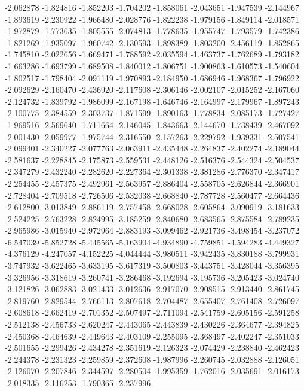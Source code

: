 -2.062878
-1.824816
-1.852203
-1.704202
-1.858061
-2.043651
-1.947539
-2.144967
-1.893619
-2.230922
-1.966480
-2.028776
-1.822238
-1.979156
-1.849114
-2.018571
-1.972879
-1.773635
-1.805555
-2.074813
-1.778635
-1.955747
-1.793579
-1.742386
-1.821269
-1.935097
-1.960742
-2.130593
-1.898389
-1.803200
-2.456119
-1.852865
-1.745810
-2.022656
-1.669471
-1.788592
-2.035594
-1.463737
-1.762689
-1.793182
-1.663286
-1.693799
-1.689508
-1.840012
-1.806751
-1.900863
-1.610573
-1.540604
-1.802517
-1.798404
-2.091119
-1.970893
-2.184950
-1.686946
-1.968367
-1.796922
-2.092629
-2.160470
-2.436920
-2.117608
-2.306146
-2.002107
-2.015252
-2.167060
-2.124732
-1.839792
-1.986099
-2.167198
-1.646746
-2.164997
-2.179967
-1.897243
-2.100775
-2.384559
-2.303737
-1.871599
-1.890163
-1.778834
-2.085173
-1.727427
-1.969516
-2.569640
-1.711664
-2.146045
-1.843663
-2.144670
-1.738439
-2.467092
-2.001430
-2.059977
-1.975744
-2.316550
-2.157263
-2.229792
-1.939331
-2.507541
-2.099401
-2.340227
-2.077763
-2.063911
-2.435448
-2.264837
-2.402274
-2.189044
-2.581637
-2.228845
-2.175873
-2.559531
-2.448126
-2.516376
-2.544324
-2.504537
-2.347279
-2.432240
-2.282620
-2.227364
-2.301338
-2.381286
-2.776370
-2.347417
-2.254455
-2.457375
-2.492961
-2.563957
-2.886404
-2.558705
-2.626844
-2.366901
-2.728404
-2.709518
-2.726506
-2.532038
-2.668840
-2.787728
-2.560477
-2.664436
-2.612800
-3.013849
-2.886119
-2.757458
-2.668028
-2.605864
-3.090919
-3.181633
-2.524225
-2.763228
-2.824995
-3.185259
-2.840680
-2.683565
-2.875584
-2.789235
-2.965986
-3.015940
-2.972964
-2.883193
-3.099462
-2.921736
-3.498454
-3.237072
-6.547039
-5.852728
-5.445565
-5.163904
-4.934890
-4.759851
-4.594283
-4.449327
-4.376129
-4.247057
-4.152225
-4.044444
-3.980511
-3.942435
-3.830188
-3.799931
-3.747932
-3.622465
-3.633195
-3.617319
-3.500803
-3.443751
-3.428044
-3.356395
-3.326956
-3.318619
-3.260741
-3.286468
-3.192694
-3.195736
-3.205423
-3.024740
-3.121826
-3.062883
-3.021433
-3.012636
-2.917070
-2.908515
-2.913440
-2.861745
-2.819760
-2.829544
-2.766113
-2.807618
-2.704487
-2.655407
-2.761408
-2.726097
-2.608618
-2.662419
-2.701352
-2.507497
-2.711094
-2.541759
-2.605156
-2.591258
-2.512138
-2.456733
-2.620247
-2.443065
-2.443839
-2.430226
-2.364677
-2.394825
-2.450368
-2.464639
-2.449643
-2.403109
-2.255095
-2.368497
-2.402247
-2.351033
-2.501655
-2.299426
-2.434278
-2.351619
-2.126323
-2.074429
-2.238840
-2.462423
-2.244378
-2.231323
-2.259859
-2.372608
-1.987996
-2.260745
-2.032888
-2.126051
-2.126070
-2.207846
-2.344597
-2.280504
-1.995359
-1.762016
-2.035691
-2.016173
-2.018335
-2.116253
-1.790365
-2.237996
